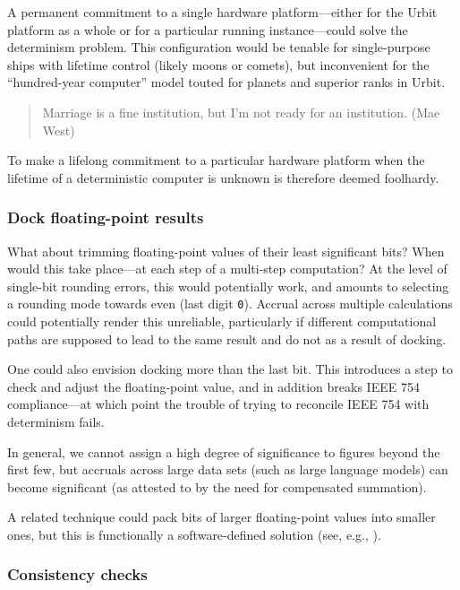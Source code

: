 \documentclass[twoside]{article}
\begin{document}
A permanent commitment to a single hardware platform—either for the Urbit platform as a whole or for a particular running instance—could solve the determinism problem.  This configuration would be tenable for single-purpose ships with lifetime control (likely moons or comets), but inconvenient for the “hundred-year computer” model touted for planets and superior ranks in Urbit.

\begin{quote}
Marriage is a fine institution, but I'm not ready for an institution.  (Mae West)
\end{quote}

To make a lifelong commitment to a particular hardware platform when the lifetime of a deterministic computer is unknown is therefore deemed foolhardy.

\subsubsection{Dock floating-point results}

What about trimming floating-point values of their least significant bits?  When would this take place—at each step of a multi-step computation?  At the level of single-bit rounding errors, this would potentially work, and amounts to selecting a rounding mode towards even (last digit \texttt{0}).  Accrual across multiple calculations could potentially render this unreliable, particularly if different computational paths are supposed to lead to the same result and do not as a result of docking.

One could also envision docking more than the last bit.  This introduces a step to check and adjust the floating-point value, and in addition breaks IEEE 754 compliance—at which point the trouble of trying to reconcile IEEE 754 with determinism fails.

In general, we cannot assign a high degree of significance to figures beyond the first few, but accruals across large data sets (such as large language models) can become significant (as attested to by the need for compensated summation).

A related technique could pack bits of larger floating-point values into smaller ones, but this is functionally a software-defined solution (see, e.g., \citet{LeBrun2018}).

\subsubsection{Consistency checks}
\end{document}
